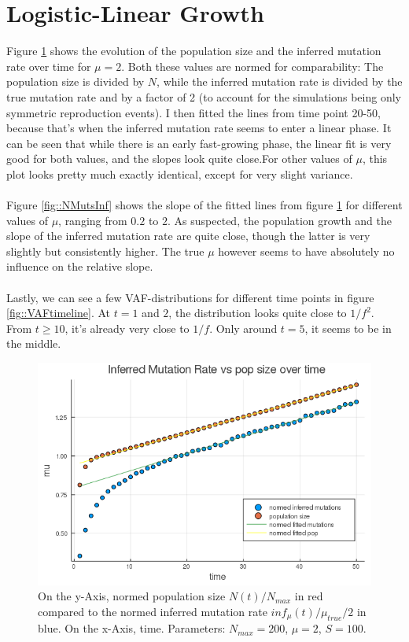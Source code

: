 \documentclass{article}
\numberwithin{equation}{subsection}
\begin{document}
	
	\section{Logistic-Linear Growth}
	
	Figure \ref{fig::NMutstime1} shows the evolution of the population size and the inferred mutation rate over time for $ \mu = 2$. Both these values are normed for comparability: The population size is divided by $N$, while the inferred mutation rate is divided by the true mutation rate and by a factor of 2 (to account for the simulations being only symmetric reproduction events). I then fitted the lines from time point 20-50, because that's when the inferred mutation rate seems to enter a linear phase. It can be seen that while there is an early fast-growing phase, the linear fit is very good for both values, and the slopes look quite close.For other values of $\mu$, this plot looks pretty much exactly identical, except for very slight variance.\\
	\\
	Figure \ref{fig::NMutsInf} shows the slope of the fitted lines from figure \ref{fig::NMutstime1} for different values of $\mu$, ranging from $0.2$ to $2$. As suspected, the population growth and the slope of the inferred mutation rate are quite close, though the latter is very slightly but consistently higher. The true $\mu$ however seems to have absolutely no influence on the relative slope.\\
	\\
	Lastly, we can see a few VAF-distributions for different time points in figure \ref{fig::VAFtimeline}. At $ t = 1$ and $2$, the distribution looks quite close to $ 1/f^2$. From $ t \geq 10 $, it's already very close to $1/f$. Only around $ t=5$, it seems to be in the middle.
	


	\begin{figure}[h!]
	\centering
	\includegraphics[width=\linewidth]{LogLinInfMutRate_N200_t50_mu2.png}
	
	\caption{On the y-Axis, normed population size $N(t)/N_{max}$ in red compared to the normed inferred mutation rate $ inf_\mu(t)/\mu_{true}/2$ in blue. On the x-Axis, time. Parameters: $ N_{max} = 200$, $\mu = 2 $, $ S = 100 $.}
	\label{fig::NMutstime1}
	\end{figure}
	
\end{document}
